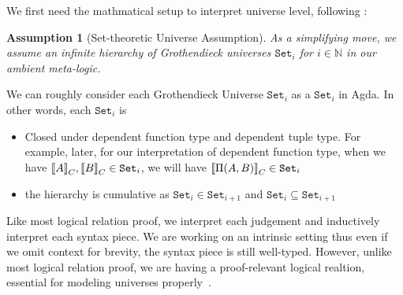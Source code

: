 We first need the mathmatical setup to interpret universe level, following \citet{sterling2019algebraic}:

\newcommand{\Set}[1]{\ensuremath{\texttt{Set}_{#1}}}
\newtheorem{assumption}{Assumption}[section]

\begin{assumption}[Set-theoretic Universe Assumption] As a simplifying move, we assume an infinite hierarchy of Grothendieck universes $\Set{i}$ for $i \in \mathbb{N}$ in our ambient meta-logic.
\end{assumption}

We can roughly consider each Grothendieck Universe $\Set{i}$ as a $\Set{i}$ in Agda. In other words, each $\Set{i}$ is 
\begin{itemize}
  \item Closed under dependent function type and dependent tuple type. For example, later, for our interpretation of dependent function type, when we have $\denotesC{A}, \denotesC{B} \in \Set{i}$, we will have $\denotesC{\TyPi{A}{B}} \in \Set{i}$
  \item the hierarchy is cumulative as $\Set{i} \in \Set{i+1}$ and $\Set{i} \subseteq \Set{i+1}$
\end{itemize}


Like most logical relation proof,  we interpret each judgement and inductively interpret each syntax piece. We are working on an intrinsic setting thus even if we omit context for brevity, the syntax piece is still well-typed. However, unlike most logical relation proof, we are having a proof-relevant logical realtion, essential for modeling universes properly~\cite{coquand2018canonicity}. 

